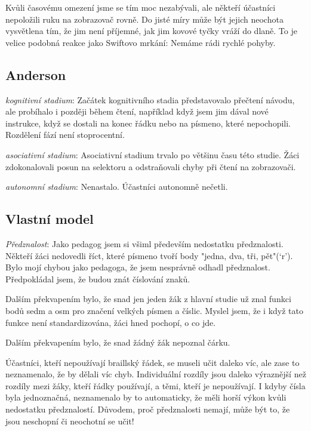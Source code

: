 Kvůli časovému omezení jsme se tím moc nezabývali, ale někteří účastníci nepoložili ruku na zobrazovač rovně.  Do jisté míry může být jejich neochota vysvětlena tím, že jim není příjemné, jak jim kovové tyčky vráží do dlaně.  To je velice podobná reakce jako Swiftovo mrkání:  Nemáme rádi rychlé pohyby.

\subsection{Anderson}

\textit{kognitivní stadium}: Začátek kognitivního stadia představovalo přečtení návodu, ale probíhalo i později během čtení, například když jsem jim dával nové instrukce, když se dostali na konec řádku nebo na písmeno, které nepochopili.  Rozdělení fází není stoprocentní.

\textit{asociativní stadium}: Asociativní stadium trvalo po většinu času této studie.  Žáci zdokonalovali posun na selektoru a odstraňovali chyby při čtení na zobrazovači.

\textit{autonomní stadium}: Nenastalo. Účastníci autonomně nečetli.

\subsection{Vlastní model}

\textit{Předznalost}:
Jako pedagog jsem si všiml především nedostatku předznalosti.
Někteří žáci nedovedli říct, které písmeno tvoří body "jedna, dva, tři, pět"(`r'). Bylo mojí chybou jako pedagoga, že jsem nesprávně odhadl předznalost.  Předpokládal jsem, že budou znát číslování znaků. 

Dalším překvapením bylo, že snad jen jeden žák z hlavní studie už znal funkci bodů sedm a osm pro značení velkých písmen a číslic.  Myslel jsem, že i když tato funkce není standardizována, žáci hned pochopí, o co jde.

Dalším překvapením bylo, že snad žádný žák nepoznal čárku.

Účastníci, kteří nepoužívají braillský řádek, se museli učit daleko víc, ale zase to neznamenalo, že by dělali víc chyb. Individuální rozdíly jsou daleko výraznější než rozdíly mezi žáky, kteří řádky používají, a těmi, kteří je nepoužívají.  I kdyby čísla byla jednoznačná, neznamenalo by to automaticky, že měli horší výkon kvůli nedostatku předznalostí. Důvodem, proč předznalosti nemají, může být to, že jsou neschopní či neochotní se učit!

